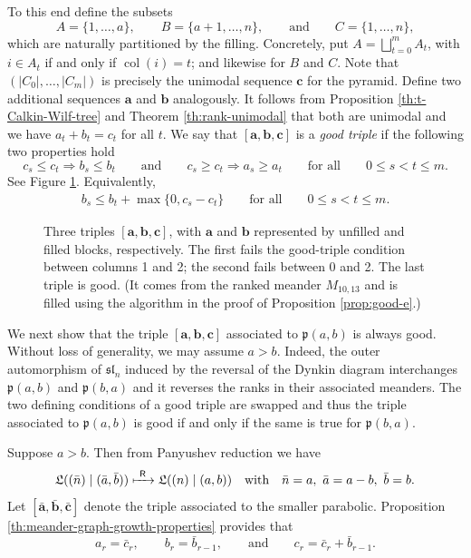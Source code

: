 \documentclass{amsart}
\newcommand{\demph}[1]{\textcolor{myblue}{\emph{#1}}}
\renewcommand{\demph}[1]{\emph{#1}}
\def\ba{\mathbf{a}}
\def\bb{\mathbf{b}}
\def\bc{\mathbf{c}}
\def\fp{\mathfrak p} %
\def\sl{\mathfrak{sl}}
\def\L{\mathfrak L}
\newcommand{\pab}[1][a,b]{\fp(#1)}
\def\sln{\sl_n}
\def\col{\operatorname{col}}
\def\pR{\mathsf R}
\theoremstyle{definition}
\begin{document}
To this end define the subsets
\[
A=\{1, \ldots, a\}, \qquad B=\{a+1, \ldots, n\},\qquad \text{and} \qquad C=\{1, \ldots, n\},
\]
which are naturally partitioned by the filling. Concretely, put $A=\bigsqcup_{t=0}^m A_t$, with $i\in A_t$ if and only if $\col(i)=t$; and likewise for $B$ and $C$. Note that $(|C_0|, \ldots, |C_m|)$ is precisely the unimodal sequence $\bc$ for the pyramid. Define two additional sequences $\ba$ and $\bb$ analogously. 
It follows from Proposition \ref{th:t-Calkin-Wilf-tree} and Theorem \ref{th:rank-unimodal} that both are unimodal and we have $a_t + b_t = c_t$ for all $t$.
We say that $[\ba, \bb, \bc]$ is a \demph{good triple} if the following two properties hold
\[
    c_s\leq c_{t}\Longrightarrow b_s\leq b_{t} \qquad\text{and}\qquad c_s\geq c_{t} \Longrightarrow a_s\geq a_{t} \qquad \text{for all}\qquad 0\leq s<t\leq m.
\]
See Figure \ref{fig:good-triples}. 
Equivalently, 
\begin{gather}
    \label{eq:good-triple-with-max}
    b_s \leq b_t + \max\{0,c_s-c_t\} \qquad \text{for all}\qquad 0\leq s<t\leq m.
\end{gather}
\begin{figure}[!hbt]
\centering


\caption{Three triples $[\ba, \bb, \bc]$, with $\ba$ and $\bb$ represented by unfilled and filled blocks, respectively. The first fails the good-triple condition between columns 1 and 2; the second fails between 0 and 2. 
The last triple is good. (It comes from the ranked meander $M_{10,13}$ and is filled using the algorithm in the proof of Proposition \ref{prop:good-e}.)}
\label{fig:good-triples}
\end{figure}


We next show that the triple $[\ba, \bb, \bc]$ associated to $\pab$ is always good. Without loss of generality, we may assume $a>b$. Indeed, the outer automorphism of $\sln$ induced by the reversal of the Dynkin diagram interchanges $\pab$ and $\mathfrak{p}(b,a)$ and it reverses the ranks in their associated meanders. The two defining conditions of a good triple are swapped and thus the triple associated to $\pab$ is good if and only if the same is true for $\mathfrak{p}(b,a)$.

Suppose $a>b$. Then from Panyushev reduction we have 
\[
\L((\bar{n})\mid(\bar{a}, \bar{b})) \xmapsto{\ \pR\ }\L((n)\mid(a, b)) \quad \text{with}\quad \bar{n}=a,\,\,\bar{a}=a-b,\,\,\bar{b} = b.\]
Let
$[\bar{\ba},\bar{\bb},\bar{\bc}]$
denote the triple associated to the smaller parabolic.
Proposition \ref{th:meander-graph-growth-properties} provides that 
\[
a_r=\bar{c}_r,\qquad b_r=\bar{b}_{r-1},\qquad \text{and}\qquad c_r=\bar c_r+\bar b_{r-1}. 
\]
\end{document}
